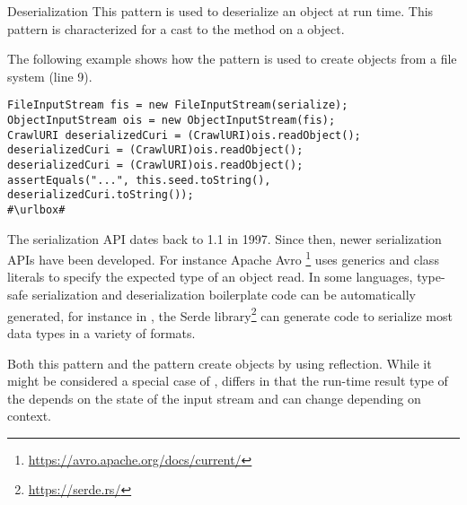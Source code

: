 \begin{pattern}{Deserialization}
This pattern is used to deserialize an object at run time.
This pattern is characterized for a cast to the  method on a  object.

\instances{}
The following example
shows how the \thisp{} pattern is used to create objects from a file system (line 9).

\def\urlvar{http://bit.ly/internetarchive_heritrix3_2SF4j7k}
\begin{verbatim}
FileInputStream fis = new FileInputStream(serialize);
ObjectInputStream ois = new ObjectInputStream(fis);
CrawlURI deserializedCuri = (CrawlURI)ois.readObject();
deserializedCuri = (CrawlURI)ois.readObject();
deserializedCuri = (CrawlURI)ois.readObject();
assertEquals("...", this.seed.toString(), deserializedCuri.toString());
#\urlbox#
\end{verbatim}

\discussion{}
  The serialization API dates back to \java{} 1.1 in 1997.
  Since then, newer serialization APIs have been developed.
  For instance Apache Avro%
  \footnote{\url{https://avro.apache.org/docs/current/}}
  uses generics and class literals to specify the expected type of an object
  read. 
  In some languages, type-safe serialization and deserialization 
  boilerplate code can be automatically generated, for instance
  in \rust{}, the Serde library\footnote{\url{https://serde.rs/}}
  can generate code to serialize most data types
  in a variety of formats.

Both this pattern and the  pattern create objects by using reflection.
While it might be considered a special case of , \thisp{} differs
  in that the run-time result type of the  depends on
  the state of the input stream and can change depending on context.
 
\end{pattern}
